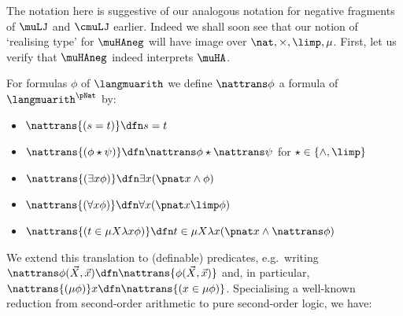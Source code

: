The notation here is suggestive of our analogous notation for negative fragments of $\muLJ$ and $\cmuLJ$ earlier.
Indeed we shall soon see that our notion of `realising type' for $\muHAneg$ will have image over $\nat, \times, \limp,\mu$.
First, let us verify that $\muHAneg$ indeed interprets $\muHA$.


\begin{definition}
    For formulas $\phi$ of $\langmuarith$ we define $\nattrans \phi$ a formula of $\langmuarith^\pNat$ by:
    \begin{itemize}
        \item $ \nattrans{(s=t)} \dfn s=t $
        \item $\nattrans {(\phi \star \psi)} \dfn \nattrans \phi \star \nattrans \psi $ for $\star \in\{ \land, \limp\}$
        \item $\nattrans {(\exists x \phi)} \dfn \exists x (\pnat x \land \phi)$
        \item $\nattrans{(\forall x \phi)}\dfn \forall x (\pnat x \limp \phi)$
          \item $ \nattrans{(t \in\mu X \lambda x \phi)} \dfn t \in \mu X \lambda x (\pnat x \land \nattrans\phi)$
    \end{itemize}
\end{definition}


We extend this translation to (definable) predicates, e.g.\ writing $\nattrans \phi(\vec X,\vec x)\dfn \nattrans{\phi(\vec X,\vec x)}$ and, in particular, $\nattrans{(\mu\phi)}x\dfn \nattrans{(x \in \mu\phi)}$.
% 
% 
% 
Specialising a well-known reduction from second-order arithmetic to pure second-order logic, we have:

